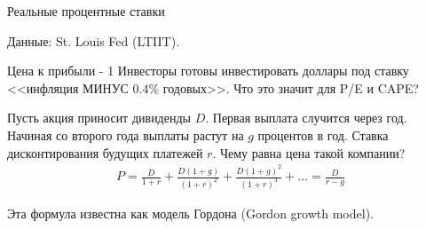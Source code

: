 \documentclass{beamer}
\begin{document}
\begin{frame}{Реальные процентные ставки}
\centering
{}
{\scriptsize Данные: St. Louis Fed (LTIIT)}.
\end{frame}



\begin{frame}{Цена к прибыли - 1}
\justify
Инвесторы готовы инвестировать доллары под ставку <<инфляция МИНУС 0.4\% годовых>>. Что это значит для P/E и CAPE?

\justify
Пусть акция приносит дивиденды $D$. Первая выплата случится через год. Начиная со второго года выплаты растут на $g$ процентов в год. Ставка дисконтирования будущих платежей $r$. Чему равна цена такой компании?
\begin{align*}
P = \frac{D}{1+r} + \frac{D(1+g)}{(1+r)^2} + \frac{D(1+g)^2}{(1+r)^3} + ... = \frac{D}{r - g}
\end{align*}

Эта формула известна как модель Гордона (Gordon growth model).
\end{frame}
\end{document}
